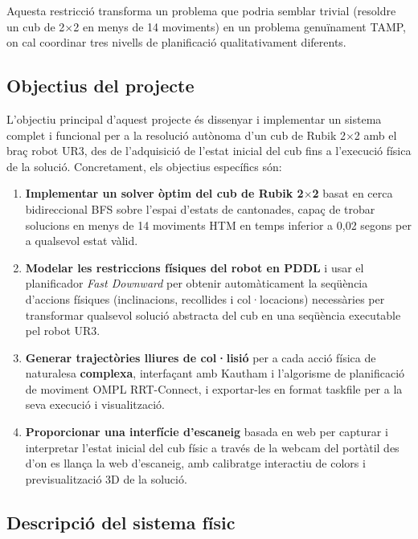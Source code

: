 \documentclass[12pt, a4paper]{article}
\begin{document}
Aquesta restricció transforma un problema que podria semblar trivial (resoldre un cub de 2$\times$2 en menys de 14 moviments) en un problema genuïnament TAMP, on cal coordinar tres nivells de planificació qualitativament diferents.

\subsection{Objectius del projecte}

L'objectiu principal d'aquest projecte és dissenyar i implementar un sistema complet i funcional per a la resolució autònoma d'un cub de Rubik 2$\times$2 amb el braç robot UR3, des de l'adquisició de l'estat inicial del cub fins a l'execució física de la solució. Concretament, els objectius específics són:

\begin{enumerate}[leftmargin=2em, label=\textbf{\arabic*.}]
  \item \textbf{Implementar un solver òptim del cub de Rubik 2$\times$2} basat en cerca bidireccional BFS sobre l'espai d'estats de cantonades, capaç de trobar solucions en menys de 14 moviments HTM en temps inferior a 0{,}02 segons per a qualsevol estat vàlid.

  \item \textbf{Modelar les restriccions físiques del robot en PDDL} i usar el planificador \textit{Fast Downward} per obtenir automàticament la seqüència d'accions físiques (inclinacions, recollides i col·locacions) necessàries per transformar qualsevol solució abstracta del cub en una seqüència executable pel robot UR3.

  \item \textbf{Generar trajectòries lliures de col·lisió} per a cada acció física de naturalesa \textbf{complexa}, interfaçant amb Kautham i l'algorisme de planificació de moviment OMPL RRT-Connect, i exportar-les en format taskfile per a la seva execució i visualització.

  \item \textbf{Proporcionar una interfície d'escaneig} basada en web per capturar i interpretar l'estat inicial del cub físic a través de la webcam del portàtil des d'on es llança la web d'escaneig, amb calibratge interactiu de colors i previsualització 3D de la solució.

\end{enumerate}

\subsection{Descripció del sistema físic}
\end{document}
